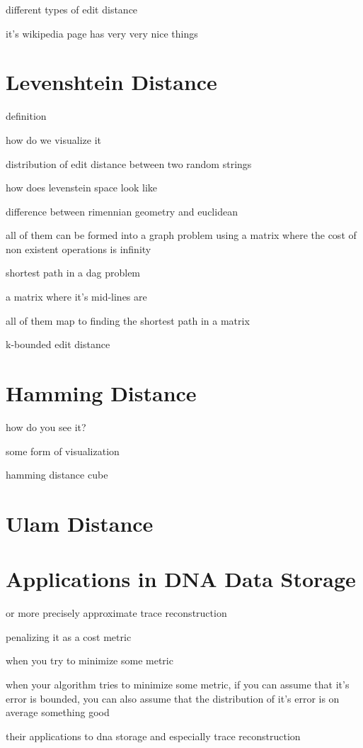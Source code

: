 different types of edit distance

it's wikipedia page has very very nice things


\section*{Levenshtein Distance}
definition

how do we visualize it

distribution of edit distance between two random strings

how does levenstein space look like

difference between rimennian geometry and euclidean

all of them can be formed into a graph problem using a matrix where the cost of non existent operations is infinity

shortest path in a dag problem

a matrix where it's mid-lines are 

all of them map to finding the shortest path in a matrix

k-bounded edit distance

\section*{Hamming Distance}

how do you see it?

some form of visualization

hamming distance cube

\section*{Ulam Distance}

\section*{Applications in DNA Data Storage}

or more precisely approximate trace reconstruction

penalizing it as a cost metric

when you try to minimize some metric

when your algorithm tries to minimize some metric, if you can assume that it's error is bounded, you can also assume that the distribution of it's error is on average something good 

their applications to dna storage and especially trace reconstruction






